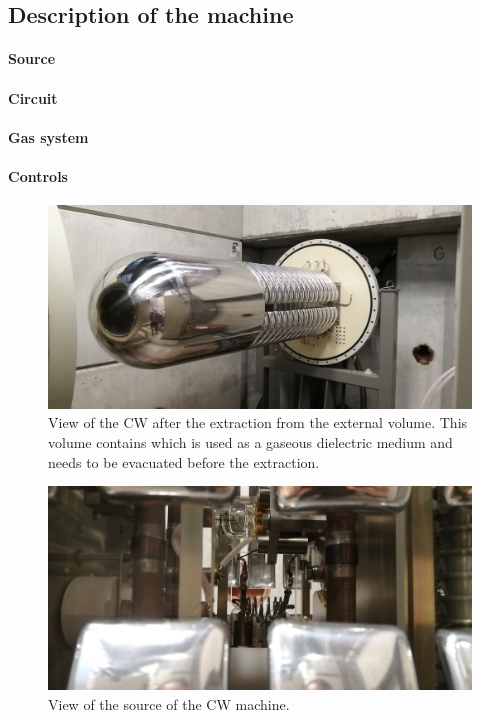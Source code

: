 \begin{refsection}
\subsection{Description of the machine}
\paragraph{Source}
\paragraph{Circuit}
\paragraph{Gas system}
\paragraph{Controls}

\begin{figure}
    \centering
    \includegraphics[width=1\textwidth]{Figures/MEG/CW/view_front.jpg}
    \caption{View of the CW after the extraction from the external volume. This volume contains  which is used as a gaseous dielectric medium and needs to be evacuated before the extraction.}
    \label{fig:CW:view}
\end{figure}

\begin{figure}
    \centering
    \includegraphics[width=1\textwidth]{Figures/MEG/CW/view_source.jpg}
    \caption{View of the source of the CW machine.}
    \label{fig:CW:view_source}
\end{figure}


\end{refsection}
